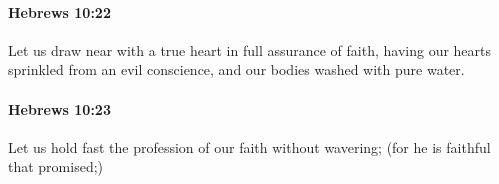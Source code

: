 		\paragraph{Hebrews 10:22} %
			\label{HEBREWS-10-22}

			Let us draw near with a true heart in full assurance of faith, having our hearts sprinkled from an evil conscience, and our bodies washed with pure water.

			\begin{framed}
			\scriptsize
				\begin{compactdesc}
					\item[SBLG] 
				\end{compactdesc}
			\end{framed}

		\paragraph{Hebrews 10:23} %
			\label{HEBREWS-10-23}

			Let us hold fast the profession of our faith without wavering; (for he is faithful that promised;)

